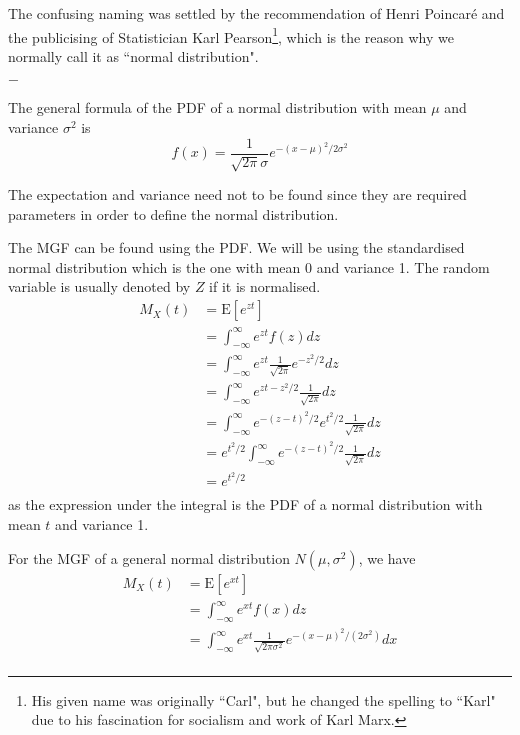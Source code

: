 \documentclass[11pt, a4paper, oneside]{book}
\theoremstyle{definition}
\newcommand{\E}[1]{\text{E}[#1]}
\newcommand{\breaking}{%
    \begin{center}
    $-$
    \end{center}%
}
\begin{document}
\noindent The confusing naming was settled by the recommendation of Henri Poincaré and the publicising of Statistician Karl Pearson\footnote{His given name was originally ``Carl", but he changed the spelling to ``Karl" due to his fascination for socialism and work of Karl Marx.}, which is the reason why we normally call it as ``normal distribution". 

\breaking

\noindent The general formula of the PDF of a normal distribution with mean $\mu$ and variance $\sigma^2$ is\[
f(x) = \frac{1}{\sqrt{2\pi}\sigma} e^{-(x-\mu)^2 /2\sigma^2}
\]

\noindent The expectation and variance need not to be found since they are required parameters in order to define the normal distribution.

\noindent The MGF can be found using the PDF. We will be using the standardised normal distribution which is the one with mean 0 and variance 1. The random variable is usually denoted by $Z$ if it is normalised. 
\begin{equation*}
\begin{split}
M_X(t) &= \E{e^{zt}} \\
&= \int_{-\infty}^{\infty} e^{zt} f(z) dz \\
&= \int_{-\infty}^{\infty} e^{zt} \frac{1}{\sqrt{2\pi}} e^{-z^2/2} dz\\
&= \int_{-\infty}^{\infty} e^{zt - z^2/2} \frac{1}{\sqrt{2\pi}} dz\\
&= \int_{-\infty}^{\infty} e^{-(z-t)^2/2} e^{t^2/2} \frac{1}{\sqrt{2\pi}} dz\\
&= e^{t^2/2} \int_{-\infty}^{\infty} e^{-(z-t)^2/2}  \frac{1}{\sqrt{2\pi}} dz\\
&= e^{t^2/2} \\
\end{split}
\end{equation*}
as the expression under the integral is the PDF of a normal distribution with mean $t$ and variance 1. 

\noindent For the MGF of a general normal distribution $N(\mu, \sigma^2)$, we have
\begin{equation*}
\begin{split}
M_X(t) &= \E{e^{xt}} \\
&= \int_{-\infty}^{\infty} e^{xt} f(x) dz \\
&= \int_{-\infty}^{\infty} e^{xt} \frac{1}{\sqrt{2\pi \sigma^2}} e^{-(x-\mu)^2/(2\sigma^2)} dx\\
\end{split}
\end{equation*}
\end{document}
